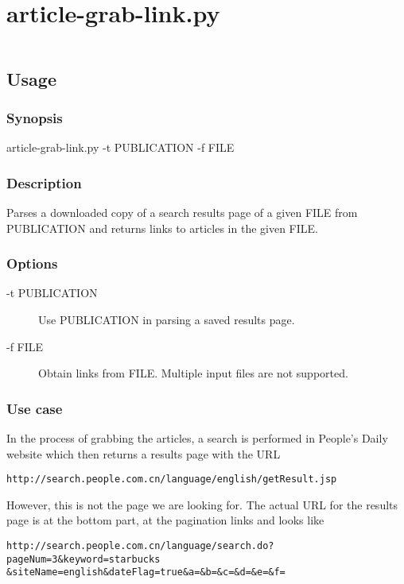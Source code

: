 \appendix
\chapter{article-grab-link.py}\label{appdx:grab-link}

\inputminted[linenos]{python}{data/script/article-grab-link.py}

\section{Usage}

\subsection{Synopsis}

article-grab-link.py -t PUBLICATION -f FILE

\subsection{Description}

Parses a downloaded copy of a search results page of a given FILE from
PUBLICATION and returns links to articles in the given FILE.

\subsection{Options}

\begin{description}
	\item [-t PUBLICATION] Use PUBLICATION in parsing a saved results page.
	\item [-f FILE] Obtain links from FILE. Multiple input files are not
	supported.
\end{description}

\subsection{Use case}

In the process of grabbing the articles, a search is performed in People's Daily
website which then returns a results page with the URL
\begin{verbatim}
http://search.people.com.cn/language/english/getResult.jsp
\end{verbatim}
However, this is not the page we are looking for. The actual URL for the results
page is at the bottom part, at the pagination links and looks like
\begin{verbatim}
http://search.people.com.cn/language/search.do?pageNum=3&keyword=starbucks
&siteName=english&dateFlag=true&a=&b=&c=&d=&e=&f=
\end{verbatim}

